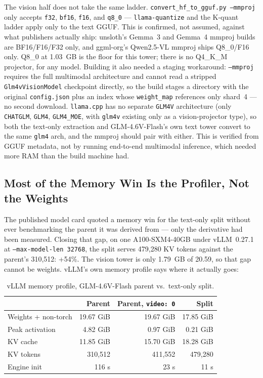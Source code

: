\documentclass[11pt]{article}
\begin{document}
The vision half does not take the same ladder. \texttt{convert\_hf\_to\_gguf.py
--mmproj} only accepts \texttt{f32}, \texttt{bf16}, \texttt{f16}, and \texttt{q8\_0} ---
\texttt{llama-quantize} and the K-quant ladder apply only to the text GGUF. This is
confirmed, not assumed, against what publishers actually ship: unsloth's Gemma~3 and
Gemma~4 mmproj builds are BF16/F16/F32 only, and ggml-org's Qwen2.5-VL mmproj ships
Q8\_0/F16 only. Q8\_0 at 1.03~GB is the floor for this tower; there is no Q4\_K\_M
projector, for any model. Building it also needed a staging workaround:
\texttt{--mmproj} requires the full multimodal architecture and cannot read a stripped
\texttt{Glm4vVisionModel} checkpoint directly, so the build stages a directory with the
original \texttt{config.json} plus an index whose \texttt{weight\_map} references only
shard~4 --- no second download. \texttt{llama.cpp} has no separate \texttt{GLM4V}
architecture (only \texttt{CHATGLM}, \texttt{GLM4}, \texttt{GLM4\_MOE}, with
\texttt{glm4v} existing only as a vision-projector type), so both the text-only
extraction and GLM-4.6V-Flash's own text tower convert to the same \texttt{glm4} arch,
and the mmproj should pair with either. This is verified from GGUF metadata, not by
running end-to-end multimodal inference, which needed more RAM than the build machine
had.

\subsection{Most of the Memory Win Is the Profiler, Not the Weights}
\label{sec:glm-memory}

The published model card quoted a memory win for the text-only split without ever
benchmarking the parent it was derived from --- only the derivative had been measured.
Closing that gap, on one A100-SXM4-40GB under vLLM~0.27.1 at
\texttt{--max-model-len 32768}, the split serves 479,280 KV tokens against the parent's
310,512: +54\%. The vision tower is only 1.79~GB of 20.59, so that gap cannot be
weights. vLLM's own memory profile says where it actually goes:

\begin{table}[h]
\centering
\small
\begin{tabular}{lrrr}
\toprule
 & Parent & Parent, \texttt{video: 0} & Split \\
\midrule
Weights + non-torch & 19.67 GiB & 19.67 GiB & 17.85 GiB \\
Peak activation & 4.82 GiB & 0.97 GiB & 0.21 GiB \\
KV cache & 11.85 GiB & 15.70 GiB & 18.28 GiB \\
KV tokens & 310,512 & 411,552 & 479,280 \\
Engine init & 116 s & 23 s & 11 s \\
\bottomrule
\end{tabular}
\caption{vLLM memory profile, GLM-4.6V-Flash parent vs.\ text-only split.}
\end{table}
\end{document}
